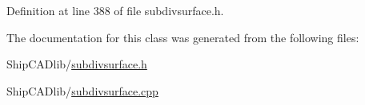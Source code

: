 Definition at line 388 of file subdivsurface.\-h.



The documentation for this class was generated from the following files\-:\begin{DoxyCompactItemize}
\item 
Ship\-C\-A\-Dlib/\hyperlink{subdivsurface_8h}{subdivsurface.\-h}\item 
Ship\-C\-A\-Dlib/\hyperlink{subdivsurface_8cpp}{subdivsurface.\-cpp}\end{DoxyCompactItemize}
